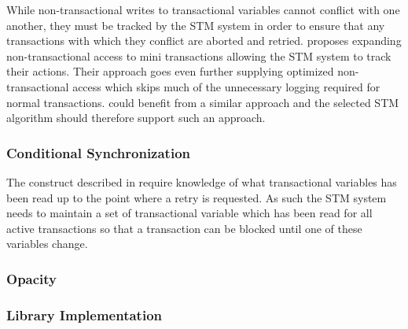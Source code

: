 While non-transactional writes to transactional variables cannot conflict with one another, they must be tracked by the \ac{STM} system in order to ensure that any transactions with which they conflict are aborted and retried. \cite{hindman2006atomicity} proposes expanding non-transactional access to mini transactions allowing the \ac{STM} system to track their actions. Their approach goes even further supplying optimized non-transactional access which skips much of the unnecessary logging required for normal transactions. \stmnamesp could benefit from a similar approach and the selected \ac{STM} algorithm should therefore support such an approach.
 
\subsubsection{Conditional Synchronization}
The  construct described in  require knowledge of what transactional variables has been read up to the point where a retry is requested. As such the \ac{STM} system needs to maintain a set of transactional variable which has been read for all active transactions so that a transaction can be blocked until one of these variables change.
\subsubsection{Opacity}
\subsubsection{Library Implementation}

